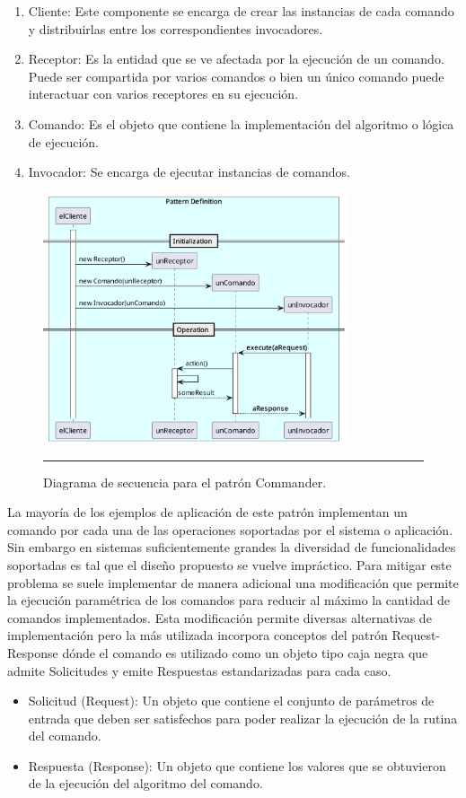 \begin{enumerate}
	\item Cliente: Este componente se encarga de crear las instancias de cada comando y distribuirlas entre los correspondientes invocadores.
	\item Receptor: Es la entidad que se ve afectada por la ejecución de un comando. Puede ser compartida por varios comandos o bien un único comando puede interactuar con varios receptores en su ejecución.
	\item Comando: Es el objeto que contiene la implementación del algoritmo o lógica de ejecución.
	\item Invocador: Se encarga de ejecutar instancias de comandos.
\end{enumerate}

\begin{figure}[htbp]
	\centering
	\includegraphics[width=0.8\textwidth]{Figures/design/SEQ_command_def_req_resp.png}
	\rule{35em}{1pt}
	\caption[MVP Components]{Diagrama de secuencia para el patrón Commander.}
	\label{fig:uml_commander_sequence}
\end{figure}

La mayoría de los ejemplos de aplicación de este patrón implementan un comando
por cada una de las operaciones soportadas por el sistema o aplicación. Sin embargo en sistemas suficientemente grandes la diversidad de funcionalidades soportadas es tal que el diseño propuesto se vuelve impráctico.
Para mitigar este problema se suele implementar de manera adicional una modificación que permite la ejecución paramétrica de los comandos para reducir al máximo la cantidad de comandos implementados.
Esta modificación permite diversas alternativas de implementación pero la más utilizada incorpora  conceptos del patrón Request-Response dónde el comando es utilizado como un objeto tipo caja negra que admite Solicitudes y emite Respuestas estandarizadas para cada caso.
\begin{itemize}
	\item Solicitud (Request): Un objeto que contiene el conjunto de parámetros de entrada que deben ser satisfechos para poder realizar la ejecución de la rutina del comando.
	\item Respuesta (Response): Un objeto que contiene los valores que se obtuvieron de la ejecución del algoritmo del comando.
\end{itemize}

